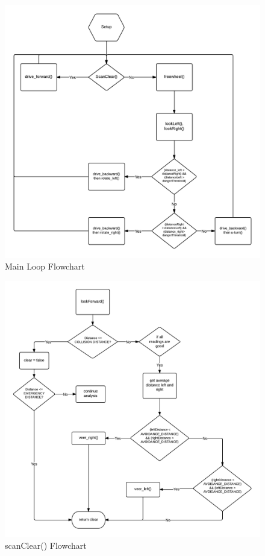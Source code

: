 \documentclass[11pt]{article}
\begin{document}
	\begin{figure}[h]\centering
	\includegraphics[height=0.85\textwidth]{images/main.png}
	\caption{Main Loop Flowchart}
		\label{main}
	\end{figure}


	\begin{figure}[h]\centering
	\includegraphics[height=0.85\textwidth]{images/scan_clear.png}
	\caption{scanClear() Flowchart}
		\label{scan}
	\end{figure}
	
\end{document}
